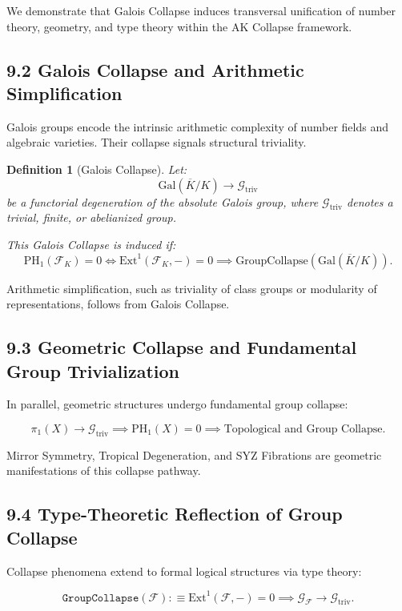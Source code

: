\documentclass[11pt]{article}
\newtheorem{definition}[theorem]{Definition}
\begin{document}
We demonstrate that Galois Collapse induces transversal unification of number theory, geometry, and type theory within the AK Collapse framework.

\subsection*{9.2 Galois Collapse and Arithmetic Simplification}

Galois groups encode the intrinsic arithmetic complexity of number fields and algebraic varieties. Their collapse signals structural triviality.

\begin{definition}[Galois Collapse]
Let:
\[
\mathrm{Gal}(\overline{K}/K) \longrightarrow \mathcal{G}_{\mathrm{triv}}
\]
be a functorial degeneration of the absolute Galois group, where \( \mathcal{G}_{\mathrm{triv}} \) denotes a trivial, finite, or abelianized group.

This Galois Collapse is induced if:
\[
\mathrm{PH}_1(\mathcal{F}_K) = 0 \iff \mathrm{Ext}^1(\mathcal{F}_K, -) = 0 \implies \mathrm{GroupCollapse}(\mathrm{Gal}(\overline{K}/K)).
\]
\end{definition}

Arithmetic simplification, such as triviality of class groups or modularity of representations, follows from Galois Collapse.

\subsection*{9.3 Geometric Collapse and Fundamental Group Trivialization}

In parallel, geometric structures undergo fundamental group collapse:

\[
\pi_1(X) \longrightarrow \mathcal{G}_{\mathrm{triv}} \implies \mathrm{PH}_1(X) = 0 \implies \text{Topological and Group Collapse}.
\]

Mirror Symmetry, Tropical Degeneration, and SYZ Fibrations are geometric manifestations of this collapse pathway.

\subsection*{9.4 Type-Theoretic Reflection of Group Collapse}

Collapse phenomena extend to formal logical structures via type theory:

\[
\texttt{GroupCollapse}(\mathcal{F}) :\equiv \mathrm{Ext}^1(\mathcal{F}, -) = 0 \implies \mathcal{G}_{\mathcal{F}} \longrightarrow \mathcal{G}_{\mathrm{triv}}.
\]
\end{document}
